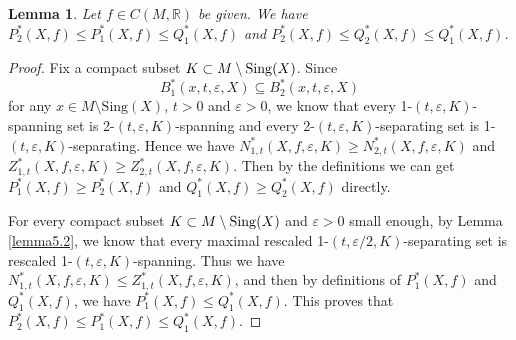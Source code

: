 \documentclass[10pt]{article}
\newtheorem*{Theorem A}{Theorem A}
\newtheorem{Lemma}[Theorem]{Lemma}
\begin{document}
\begin{Lemma}\label{lemma5.4}
Let $f\in C(M, \mathbb{R})$ be given. We have $P_2^*(X,f)\leq P_1^*(X, f)\leq Q_1^*(X, f)$ and $P_2^*(X, f)\leq Q_2^*(X, f)\leq Q_1^*(X,f)$.
\end{Lemma}
\begin{proof}
Fix a compact subset $K\subset M\setminus{\rm Sing}(X)$. Since
\[
B_1^*(x, t, \varepsilon, X) \subseteq B_2^*(x, t, \varepsilon, X)
\]
for any \( x \in M \setminus \text{Sing}(X) \), \( t > 0 \) and \( \varepsilon > 0 \), we know that every 1-$(t, \varepsilon, K)$-spanning set is 2-$(t, \varepsilon, K)$-spanning and every 2-$(t, \varepsilon, K)$-separating set is 1-$(t, \varepsilon, K)$-separating. Hence we have $N_{1, t}^*(X, f, \varepsilon, K)\geq N_{2, t}^*(X, f, \varepsilon, K)$ and $Z
_{1, t}^*(X, f, \varepsilon, K)\geq Z_{2, t}^*(X, f, \varepsilon, K)$. Then by the definitions we can get $P_1^*(X, f)\geq P_2^*(X, f)$  and $Q_1^*(X, f)\geq Q_2^*(X, f)$ directly.


For every compact subset $K\subset M\setminus{\rm Sing}(X)$ and $\varepsilon>0$ small enough, by Lemma \ref{lemma5.2}, we know that every maximal rescaled 1-$(t, \varepsilon/2, K)$-separating set is rescaled 1-$(t, \varepsilon, K)$-spanning. Thus we have $N_{1, t}^*(X, f, \varepsilon, K)\leq Z_{1, t}^*(X, f, \varepsilon, K)$, and then by definitions of $P_1^*(X, f)$ and $Q_1^*(X, f)$, we have $P_1^*(X, f)\leq Q_1^*(X, f)$. This proves that $P_2^*(X, f)\leq P_1^*(X, f)\leq Q_1^*(X,f)$.


\end{proof}
\end{document}
